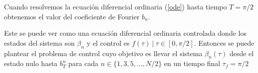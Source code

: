 Cuando resolvemos la ecuación diferencial ordinaria (\ref{ode}) hasta tiempo $T = \pi/2$ obtenemos el valor del coeficiente de Fourier $b_n$.

Este se puede ver como una ecuación diferencial ordinaria controlada donde los estados del sistema son $\beta_n$ y el control es $f(\tau) \ | \ \tau \in [0,\pi/2]$.
%
Entonces se puede plantear el problema de control cuyo objetivo es llevar el sistema $\beta_n(\tau)$ desde el estado nulo hasta $b_T^n$ para cada $n \in \{1,3,5,\dots,N/2 \}$ en un tiempo final $\tau_f = \pi/2$